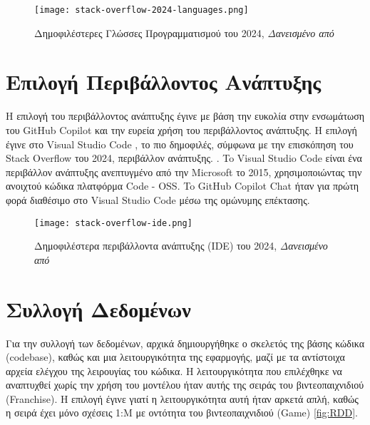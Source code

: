 \begin{figure}[H]
  \begin{center}
    \texttt{[image: stack-overflow-2024-languages.png]}
    \caption{Δημοφιλέστερες Γλώσσες Προγραμματισμού του 2024,
      \textit{Δανεισμένο από \cite{so2024}}}
  \end{center}
  \label{fig:SO2024LANGS}
\end{figure}

\section{Επιλογή Περιβάλλοντος Ανάπτυξης }

Η επιλογή του περιβάλλοντος ανάπτυξης έγινε με βάση την ευκολία στην
ενσωμάτωση του \textlatin{GitHub Copilot} και την ευρεία χρήση του
περιβάλλοντος ανάπτυξης. Η επιλογή έγινε στο \textlatin{Visual Studio
  Code} \cite{vscode}, το πιο δημοφιλές, σύμφωνα με την επισκόπηση του
\textlatin{Stack Overflow} του 2024, περιβάλλον ανάπτυξης.
\cite{so2024}. To \textlatin{Visual Studio Code} είναι ένα περιβάλλον
ανάπτυξης ανεπτυγμένο από την \textlatin{Microsoft} το 2015,
χρησιμοποιώντας την ανοιχτού κώδικα πλατφόρμα \textlatin{Code - OSS}. To
\textlatin{GitHub Copilot Chat} ήταν για πρώτη φορά διαθέσιμο στο
\textlatin{Visual Studio Code} μέσω της ομώνυμης επέκτασης.
\cite{copilotchatrepo}

\begin{figure}[H]
  \begin{center}
    \texttt{[image: stack-overflow-ide.png]}
    \caption{Δημοφιλέστερα περιβάλλοντα ανάπτυξης (\textlatin{IDE}) του
      2024, \textit{Δανεισμένο από \cite{so2024}}}
  \end{center}
  \label{fig:SO2024IDES}
\end{figure}

\section{Συλλογή Δεδομένων}

Για την συλλογή των δεδομένων, αρχικά δημιουργήθηκε ο σκελετός της βάσης
κώδικα \textlatin{(codebase)}, καθώς και μια λειτουργικότητα της
εφαρμογής, μαζί με τα αντίστοιχα αρχεία ελέγχου της λειρουγίας του
κώδικα. Η λειτουργικότητα που επιλέχθηκε να αναπτυχθεί χωρίς την χρήση
του μοντέλου ήταν αυτής της σειράς του βιντεοπαιχνιδιού
\textlatin{(Franchise)}. Η επιλογή έγινε γιατί η λειτουργικότητα αυτή
ήταν αρκετά απλή, καθώς η σειρά έχει μόνο σχέσεις 1:Μ με οντότητα του
βιντεοπαιχνιδιού \textlatin{(Game)} \ref{fig:RDD}.

